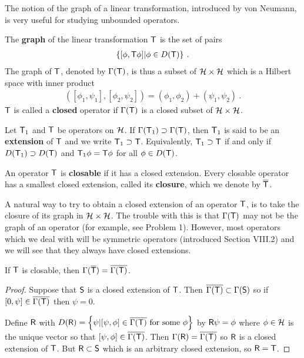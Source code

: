The notion of the graph of a linear transformation, introduced by von Neumann, is very useful for studying unbounded operators.

\begin{definition}
The \textbf{graph} of the linear transformation $\mathsf{T}$ is the set of pairs
\begin{align}
    \left \lbrace [\phi, \mathsf{T} \phi] | \phi \in D(\mathsf{T}) \right \rbrace \:.
\end{align}
The graph of $\mathsf{T}$, denoted by $\Gamma(\mathsf{T})$, is thus a subset of $\mathcal{H} \times \mathcal{H}$ which is a Hilbert space with inner product \begin{align}
    \left([\phi_1, \psi_1], [\phi_2, \psi_2] \right) = (\phi_1, \phi_2) + (\psi_1, \psi_2) \:.
\end{align}
$\mathsf{T}$ is called a \textbf{closed} operator if $\Gamma(\mathsf{T})$ is a closed subset of $\mathcal{H} \times \mathcal{H}$.
\end{definition}

\begin{definition}
    Let $\mathsf{T}_1$ and $\mathsf{T}$ be operators on $\mathcal{H}$. If $\Gamma(\mathsf{T}_1) \supset \Gamma(\mathsf{T})$, then $\mathsf{T}_1$ is said to be an \textbf{extension }of $\mathsf{T}$ and we write $\mathsf{T}_1 \supset \mathsf{T}$. Equivalently, $\mathsf{T}_1 \supset \mathsf{T}$ if and only if $D(\mathsf{T}_1) \supset D(\mathsf{T})$ and $\mathsf{T}_1 \phi = \mathsf{T} \phi$ for all $\phi \in D(\mathsf{T})$.
\end{definition}

\begin{definition}
An operator $\mathsf{T}$ is \textbf{closable} if it has a closed extension. Every closable operator has a smallest closed extension, called its \textbf{closure}, which we denote by $\overline{\mathsf{T}}$.   
\end{definition}


A natural way to try to obtain a closed extension of an operator $\mathsf{T}$, is to take the closure of its graph in $\mathcal{H} \times \mathcal{H}$. The trouble with this is that $\Gamma(\mathsf{T})$ may not be the graph of an operator (for example, see Problem 1). However, most operators which we deal with will be symmetric operators (introduced Section VIII.2) and we will see that they always have closed extensions.

\begin{proposition}
If $\mathsf{T}$ is closable, then $\Gamma(\overline{\mathsf{T}}) = \overline{\Gamma(\mathsf{T})}$.
\end{proposition}

\begin{proof}
Suppose that $\mathsf{S}$ is a closed extension of $\mathsf{T}$. Then $\overline{\Gamma(\mathsf{T})} \subset \Gamma(\mathsf{S})$ so if $[0, \psi] \in \overline{\Gamma(\mathsf{T})}$ then $\psi = 0$.  

Define $\mathsf{R}$ with $D(\mathsf{R}) = \left \lbrace \psi | [\psi, \phi] \in \overline{\Gamma(\mathsf{T})} \text{ for some } \phi \right \rbrace$ by $\mathsf{R} \psi = \phi$ where $\phi \in \mathcal{H}$ is the unique vector so that $[\psi, \phi] \in \overline{\Gamma(\mathsf{T})}$. Then
$\Gamma(\mathsf{R}) = \overline{\Gamma(\mathsf{T})}$ so $\mathsf{R}$ is a closed extension of $\mathsf{T}$. But $\mathsf{R} \subset \mathsf{S}$ which is an arbitrary
closed extension, so $\mathsf{R}= \mathsf{T}$.
\end{proof}

